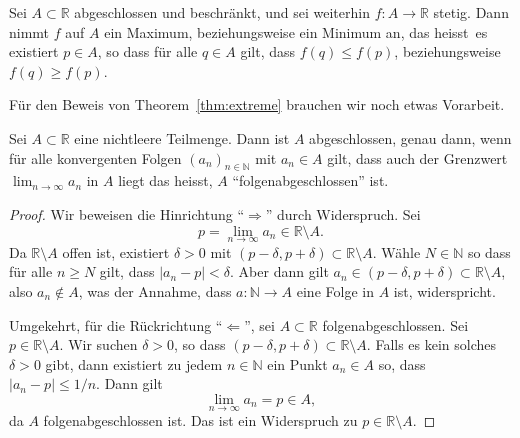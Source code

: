 \documentclass[../main.tex]{subfiles}
\begin{document}
\begin{theorem}\label{thm:extreme}
  Sei $A \subset \mathbb{R}$ abgeschlossen
  und beschränkt,
  und sei weiterhin $f \colon A \to \mathbb{R}$
  stetig. Dann nimmt $f$ auf $A$ ein
  Maximum, beziehungsweise ein Minimum an,
  das heisst~es existiert $p \in A$,
  so dass für alle $q \in A$ gilt,
  dass $f(q) \leq f(p)$, beziehungsweise $f(q) \geq f(p)$.
\end{theorem}

Für den Beweis von Theorem~\ref{thm:extreme}
brauchen wir noch etwas Vorarbeit.

\begin{lemma*}[Folgenabgeschlossenheit]
  Sei $A \subset \mathbb{R}$ eine nichtleere Teilmenge.
  Dann ist $A$ abgeschlossen, genau dann, wenn für
  alle konvergenten Folgen
  ${(a_{n})}_{n \in \mathbb{N}}$ mit
  $a_n \in A$ gilt, dass auch
  der Grenzwert $\lim_{n \to \infty} a_n$ in $A$ 
  liegt das heisst, $A$ ``folgenabgeschlossen'' ist.
\end{lemma*}

\begin{proof}
  Wir beweisen die Hinrichtung ``$\Rightarrow$'' durch Widerspruch.
  Sei
  \[
    p = \lim_{n \to \infty} a_n \in \mathbb{R} \setminus A.
  \]
  Da $\mathbb{R} \setminus A$ offen ist,
  existiert $\delta > 0$ mit $(p - \delta, p + \delta)
  \subset \mathbb{R} \setminus A$.
  Wähle $N \in \mathbb{N}$  so dass für alle $n \geq N$
  gilt, dass $|a_n - p| < \delta$.
  Aber dann gilt $a_n \in (p - \delta, p + \delta)
  \subset \mathbb{R} \setminus A$,
  also $a_n \notin A$, was der Annahme, dass 
  $a \colon \mathbb{N} \to A$
  eine Folge in $A$ ist, widerspricht.

  Umgekehrt, für die Rückrichtung ``$\Leftarrow$'', sei
  $A \subset \mathbb{R}$ folgenabgeschlossen.
  Sei $p \in \mathbb{R} \setminus A$. Wir suchen
  $\delta > 0$, so dass $(p - \delta, p + \delta)
  \subset \mathbb{R} \setminus A$. Falls es kein
  solches $\delta > 0$ gibt, dann existiert zu jedem
  $n \in \mathbb{N}$ ein Punkt $a_n \in A$ so, dass
  $|a_n - p| \leq 1/n$.
  Dann gilt
  \[
    \lim_{n \to \infty} a_n = p \in A,
  \]
  da $A$ folgenabgeschlossen ist. Das ist ein Widerspruch
  zu $p \in \mathbb{R} \setminus A$.
\end{proof}
\end{document}

